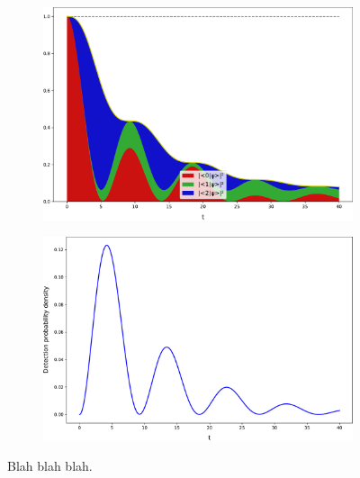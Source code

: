 
\begin{figure}[h]
  \begin{subfigure}[b]{\textwidth}
    \centering
    \includegraphics[width=.8\textwidth]{img/3ldetect/loss3color.pdf}
  \end{subfigure}
  \par\bigskip
  \par\bigskip
  \begin{subfigure}[b]{\textwidth}
    \centering
    \includegraphics[width=.8\textwidth]{img/3ldetect/loss.pdf}
  \end{subfigure}
  \par\bigskip
  \par\bigskip
  \caption{
    Blah blah blah.
  }
\end{figure}



